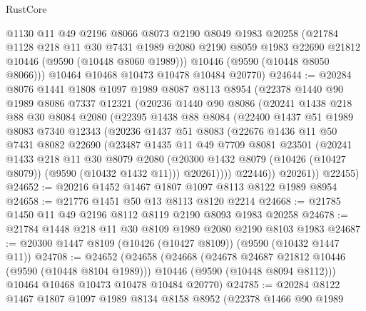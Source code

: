 \begin{lexlean}{RustCore}
\begin{coremodule}
        @1130
        @11
        @49
        @2196
        @8066
        @8073
        @2190
        @8049
        @1983
        @20258
        (@21784
          @1128
          @218
          @11
          @30
          @7431
          @1989
          @2080
          @2190
          @8059
          @1983
          @22690
          @21812
          @10446
          (@9590 (@10448 @8060 @1989)))
        @10446
        (@9590 (@10448 @8050 @8066)))
      @10464
      @10468
      @10473
      @10478
      @10484
      @20770)
@24644 := @20284
    @8076
    @1441
    @1808
    @1097
    @1989
    @8087
    @8113
    @8954
    (@22378
      @1440
      @90
      @1989
      @8086
      @7337
      @12321
      (@20236
        @1440
        @90
        @8086
        (@20241
          @1438
          @218
          @88
          @30
          @8084
          @2080
          (@22395
            @1438
            @88
            @8084
            (@22400
              @1437
              @51
              @1989
              @8083
              @7340
              @12343
              (@20236
                @1437
                @51
                @8083
                (@22676
                  @1436
                  @11
                  @50
                  @7431
                  @8082
                  @22690
                  (@23487
                    @1435
                    @11
                    @49
                    @7709
                    @8081
                    @23501
                    (@20241
                      @1433
                      @218
                      @11
                      @30
                      @8079
                      @2080
                      (@20300 @1432 @8079 (@10426 (@10427 @8079)) (@9590 (@10432 @1432 @11)))
                      @20261))))
              @22446))
          @20261))
      @22455)
@24652 := @20216 @1452 @1467 @1807 @1097 @8113 @8122 @1989 @8954
@24658 := @21776 @1451 @50 @13 @8113 @8120 @2214
@24668 := @21785 @1450 @11 @49 @2196 @8112 @8119 @2190 @8093 @1983 @20258
@24678 := @21784 @1448 @218 @11 @30 @8109 @1989 @2080 @2190 @8103 @1983
@24687 := @20300 @1447 @8109 (@10426 (@10427 @8109)) (@9590 (@10432 @1447 @11))
@24708 := @24652
    (@24658
      (@24668
        (@24678 @24687 @21812 @10446 (@9590 (@10448 @8104 @1989)))
        @10446
        (@9590 (@10448 @8094 @8112)))
      @10464
      @10468
      @10473
      @10478
      @10484
      @20770)
@24785 := @20284
    @8122
    @1467
    @1807
    @1097
    @1989
    @8134
    @8158
    @8952
    (@22378
      @1466
      @90
      @1989

\end{coremodule}
\end{lexlean}
